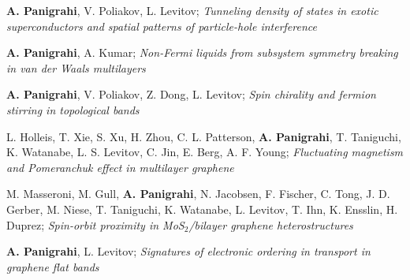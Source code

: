 

\begin{cventries}

  \cventry
    {} %
    {} %
    {} %
    {} %
    {
	  \begin{cvitems} %
	  	\item{\textbf{A. Panigrahi}, V. Poliakov, L. Levitov; \textit{Tunneling density of states in exotic superconductors and spatial patterns of particle-hole interference} }
	  	\item{\textbf{A. Panigrahi}, A. Kumar; \textit{Non-Fermi liquids from subsystem symmetry breaking in van der Waals multilayers} }
	  	\item{\textbf{A. Panigrahi}, V. Poliakov, Z. Dong, L. Levitov; \textit{Spin chirality and fermion stirring in topological bands}
	  		}
	  	\item{L. Holleis, T. Xie, S. Xu, H. Zhou, C. L. Patterson, \textbf{A. Panigrahi}, T. Taniguchi, K. Watanabe, L. S. Levitov, C. Jin, E. Berg, A. F. Young; \textit{Fluctuating magnetism and Pomeranchuk effect in multilayer graphene}
	  	}
	  	\item{M. Masseroni, M. Gull, \textbf{A. Panigrahi}, N. Jacobsen, F. Fischer, C. Tong, J. D. Gerber, M. Niese, T. Taniguchi, K. Watanabe, L. Levitov, T. Ihn, K. Ensslin, H. Duprez; \textit{Spin-orbit proximity in MoS$_2$/bilayer graphene heterostructures}
	  		}
	  	\item{\textbf{A. Panigrahi}, L. Levitov; \textit{Signatures of electronic ordering in transport in graphene flat bands} }

\end{cvitems}}
\end{cventries}
